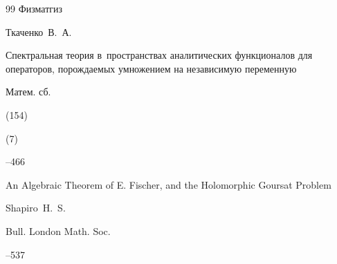 \begin{thebibliography}{99}
\publ Физматгиз







\by Ткаченко~В.~А.

\paper Спектральная теория в~пространствах аналитических функционалов для операторов, порождаемых умножением на независимую переменную

\jour Матем. сб.


(154)

(7)

--466

















\paper An Algebraic Theorem of E. Fischer, and the Holomorphic Goursat Problem

\by Shapiro~H.~S.

\jour Bull. London Math. Soc.




--537





\end{thebibliography}
